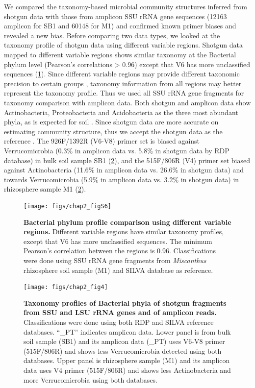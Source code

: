 \documentclass[]{msu-thesis}
\begin{document}
We compared the taxonomy-based microbial community structures inferred from shotgun data with those from amplicon SSU rRNA gene sequences (12163 amplicon for SB1 and 60148 for M1) and confirmed known primer biases and revealed a new bias. Before comparing two data types, we looked at the taxonomy profile of shotgun data using different variable regions. Shotgun data mapped to different variable regions shows similar taxonomy at the Bacterial phylum level (Pearson’s correlations > 0.96) except that V6 has more unclassified sequences (\cref{fig:chap2FigS6}). Since different variable regions may provide different taxonomic precision to certain groups \cite{guo_taxonomic_2013}, taxonomy information from all regions may better represent the taxonomy profile. Thus we used all SSU rRNA gene fragments for taxonomy comparison with amplicon data. Both shotgun and amplicon data show Actinobacteria, Proteobacteria and Acidobacteria as the three most abundant phyla, as is expected for soil \cite{janssen_identifying_2006}. Since shotgun data are more accurate on estimating community structure, thus we accept the shotgun data as the reference \cite{haas_chimeric_2011,shakya_comparative_2013}. The 926F/1392R (V6-V8) primer set is biased against Verrucomicrobia (0.3\% in amplicon data vs. 5.8\% in shotgun data by RDP database) in bulk soil sample SB1 (\cref{fig:chap2Fig4}), and the 515F/806R (V4) primer set biased against Actinobacteria (11.6\% in amplicon data vs. 26.6\% in shotgun data) and towards Verrucomicrobia (5.9\% in amplicon data vs. 3.2\% in shotgun data) in rhizosphere sample M1 (\cref{fig:chap2Fig4}).


\begin{figure}[tbph!]
  \centering
  \texttt{[image: figs/chap2\_figS6]}
  \caption[Bacterial phylum profile comparison using different variable regions]{\textbf{Bacterial phylum profile comparison using different variable regions.} Different variable regions have similar taxonomy profiles, except that V6 has more unclassified sequences. The minimum Pearson’s correlation between the regions is 0.96. Classifications were done using SSU rRNA gene fragments from \textit{Miscanthus} rhizosphere soil sample (M1) and SILVA database as reference.}
  \label{fig:chap2FigS6}
\end{figure}


\begin{figure}[tbph!]
  \centering
  \texttt{[image: figs/chap2\_fig4]}
  \caption[Taxonomy profiles of Bacterial phyla of shotgun fragments from SSU and LSU rRNA genes and of amplicon reads]{\textbf{Taxonomy profiles of Bacterial phyla of shotgun fragments from SSU and LSU rRNA genes and of amplicon reads.} Classifications were done using both RDP and SILVA reference databases. ``\_PT'' indicates amplicon data. Lower panel is from bulk soil sample (SB1) and its amplicon data (\_PT) uses V6-V8 primer (515F/806R) and shows less Verrucomicrobia detected using both databases. Upper panel is rhizosphere sample (M1) and its amplicon data uses V4 primer (515F/806R) and shows less Actinobacteria and more Verrucomicrobia using both databases.}
  \label{fig:chap2Fig4}
\end{figure}
\end{document}
